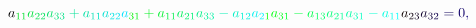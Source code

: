 \documentclass[12pt]{article}
\begin{document}
\begin{displaymath}
{a} _ { \mathcolor[RGB]{0,225,30}{1} \mathcolor[RGB]{0,225,45}{1} } \mathcolor[RGB]{0,225,60}{a} _ { \mathcolor[RGB]{0,225,75}{2} \mathcolor[RGB]{0,225,90}{2} } \mathcolor[RGB]{0,225,105}{a} _ { \mathcolor[RGB]{0,225,120}{3} \mathcolor[RGB]{0,225,135}{3} } \mathcolor[RGB]{0,225,150}{+} \mathcolor[RGB]{0,225,165}{a} _ { \mathcolor[RGB]{0,225,180}{1} \mathcolor[RGB]{0,225,195}{1} } \mathcolor[RGB]{0,225,210}{a} _ { \mathcolor[RGB]{0,225,225}{2} \mathcolor[RGB]{0,225,240}{2} } \mathcolor[RGB]{0,225,255}{a} _ { \mathcolor[RGB]{0,240,0}{3} \mathcolor[RGB]{0,240,15}{1} } \mathcolor[RGB]{0,240,30}{+} \mathcolor[RGB]{0,240,45}{a} _ { \mathcolor[RGB]{0,240,60}{1} \mathcolor[RGB]{0,240,75}{1} } \mathcolor[RGB]{0,240,90}{a} _ { \mathcolor[RGB]{0,240,105}{2} \mathcolor[RGB]{0,240,120}{1} } \mathcolor[RGB]{0,240,135}{a} _ { \mathcolor[RGB]{0,240,150}{3} \mathcolor[RGB]{0,240,165}{3} } \mathcolor[RGB]{0,240,180}{-} \mathcolor[RGB]{0,240,195}{a} _ { \mathcolor[RGB]{0,240,210}{1} \mathcolor[RGB]{0,240,225}{2} } \mathcolor[RGB]{0,240,240}{a} _ { \mathcolor[RGB]{0,240,255}{2} \mathcolor[RGB]{0,255,0}{1} } \mathcolor[RGB]{0,255,15}{a} _ { \mathcolor[RGB]{0,255,30}{3} \mathcolor[RGB]{0,255,45}{1} } \mathcolor[RGB]{0,255,60}{-} \mathcolor[RGB]{0,255,75}{a} _ { \mathcolor[RGB]{0,255,90}{1} \mathcolor[RGB]{0,255,105}{3} } \mathcolor[RGB]{0,255,120}{a} _ { \mathcolor[RGB]{0,255,135}{2} \mathcolor[RGB]{0,255,150}{1} } \mathcolor[RGB]{0,255,165}{a} _ { \mathcolor[RGB]{0,255,180}{3} \mathcolor[RGB]{0,255,195}{1} } \mathcolor[RGB]{0,255,210}{-} \mathcolor[RGB]{0,255,225}{a} _ { \mathcolor[RGB]{0,255,240}{1} \mathcolor[RGB]{0,255,255}{1} } \mathcolor[RGB]{15,0,0}{a} _ { \mathcolor[RGB]{15,0,15}{2} \mathcolor[RGB]{15,0,30}{3} } \mathcolor[RGB]{15,0,45}{a} _ { \mathcolor[RGB]{15,0,60}{3} \mathcolor[RGB]{15,0,75}{2} } \mathcolor[RGB]{15,0,90}{=} \mathcolor[RGB]{15,0,105}{0} \mathcolor[RGB]{15,0,120}{,} \mathcolor[RGB]{15,0,135}{\,
}
\end{displaymath}
\end{document}
